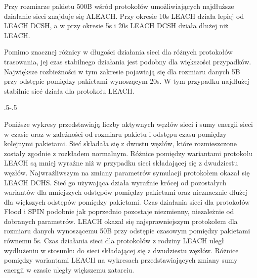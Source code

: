 Przy rozmiarze pakietu 500B wśród protokołów umożliwiających najdłuższe działanie sieci znajduje się ALEACH. Przy okresie 10s LEACH działa lepiej od LEACH DCSH, a w przy okresie 5s i 20s LEACH DCSH działa dłużej niż LEACH.

Pomimo znacznej różnicy w długości działania sieci dla różnych protokołów trasowania, jej czas stabilnego działania jest podobny dla większości przypadków. Największe rozbieżności w tym zakresie pojawiają się dla rozmiaru danych 5B przy odstępie pomiędzy pakietami wynoszącym 20s. W tym przypadku najdłużej stabilnie sieć działa dla protokołu LEACH. 

\clearpage
\thispagestyle{empty}

 {\pdfpagewidth
    \vspace*{-2cm}
    \noindent\kern.5\pdfpagewidth{}\kern-.5\pdfpagewidth
     \par
     \vspace*{-5cm}
\clearpage
\thispagestyle{empty}
    \vspace*{-2cm}
    \noindent\parbox{\textwidth}{%
    \noindent{}\endgraf
    \vspace{2ex}%
    }
     \par
     \vspace*{-5cm}
\clearpage
}

Poniższe wykresy przedstawiają liczby aktywnych węzłów sieci i sumy energii sieci w czasie oraz w zależności od rozmiaru pakietu i odstępu czasu pomiędzy kolejnymi pakietami. Sieć składała się z dwustu węzłów, które rozmieszczone zostały zgodnie z rozkładem normalnym. Różnice pomiędzy wariantami protokołu LEACH są mniej wyraźne niż w przypadku sieci składającej się z dwudziestu węzłów. Najwrażliwszym na zmiany parametrów symulacji protokołem okazał się LEACH DCHS. Sieć go używająca działa wyraźnie krócej od pozostałych wariantów dla mniejszych odstępów pomiędzy pakietami oraz nieznacznie dłużej dla większych odstępów pomiędzy pakietami. Czas działania sieci dla protokołów Flood i SPIN podobnie jak poprzednio pozostaje niezmienny, niezależnie od dobranych parametrów.
LEACH okazał się najsprawniejszym protokołem dla rozmiaru danych wynoszącemu 50B przy odstępie czasowym pomiędzy pakietami równemu 5s.
Czas działania sieci dla protokołów z rodziny LEACH uległ wydłużeniu w stosunku do sieci składającej się z dwudziestu węzłów.
Różnice pomiędzy wariantami LEACH na wykresach przedstawiających zmiany sumy energii w czasie uległy większemu zatarciu.

